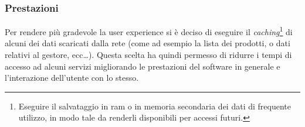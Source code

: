 \subsubsection{Prestazioni}
Per rendere più gradevole la user experience si è deciso di eseguire il \emph{caching}\footnote{Eseguire il salvataggio in ram o in memoria secondaria dei dati di frequente utilizzo, in modo tale da renderli disponibili per accessi futuri.} di alcuni dei dati scaricati dalla rete (come ad esempio la lista dei prodotti, o dati relativi al gestore, ecc\dots). Questa scelta ha quindi permesso di ridurre i tempi di accesso ad alcuni servizi migliorando le prestazioni del software in generale e l'interazione dell'utente con lo stesso.  